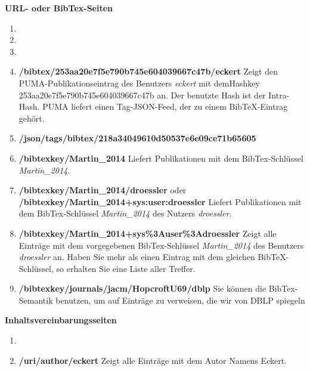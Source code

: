 \documentclass[a4paper,11pt,twoside]{scrbook}
\begin{document}
\textbf{URL- oder BibTex-Seiten}%
\begin{enumerate}
    \item 
    \item 
    \item 
    \item \textbf{/bibtex/253aa20e7f5e790b745e604039667c47b/eckert}\newline
    Zeigt den PUMA-Publikationseintrag des Benutzers \textit{eckert} mit dem\newline Hashkey 253aa20e7f5e790b745e604039667c47b an. Der benutzte Hash ist der Intra-Hash. PUMA liefert einen Tag-JSON-Feed, der zu einem BibTeX-Eintrag gehört.
    \item \textbf{/json/tags/bibtex/218a34049610d50537e6e09ce71b65605}\newline 
    
    \item \textbf{/bibtexkey/Martin\_2014} \newline
    Liefert Publikationen mit dem BibTex-Schlüssel \textit{Martin\_2014}.
    \item \textbf{/bibtexkey/Martin\_2014/droessler} 
    oder \newline \textbf{/bibtexkey/Martin\_2014+sys:user:droessler}\newline
    Liefert Publikationen mit dem BibTex-Schlüssel \textit{Martin\_2014} des Nutzers \textit{droessler}.
    \item \textbf{/bibtexkey/Martin\_2014+sys\%3Auser\%3Adroessler} \newline
    Zeigt alle Einträge mit dem vorgegebenen BibTex-Schlüssel \textit{Martin\_2014} des Benutzers \textit{droessler} an. Haben Sie mehr als einen Eintrag mit dem gleichen BibTeX-Schlüssel, so erhalten Sie eine Liste aller Treffer.
    \item \textbf{/bibtexkey/journals/jacm/HopcroftU69/dblp} \newline
    Sie können die BibTex-Semantik benutzen, um auf Einträge zu verweisen, die wir von DBLP spiegeln  %
\end{enumerate}

\textbf{Inhaltsvereinbarungsseiten}
\begin{enumerate}
    \item 
    \item \textbf{/uri/author/eckert} \newline
    Zeigt alle Einträge mit dem Autor Namens Eckert.
\end{enumerate}
\end{document}
